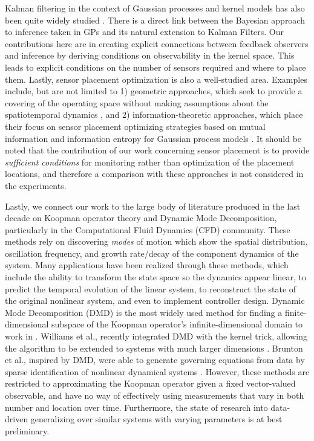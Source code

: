 Kalman filtering in the context of Gaussian processes and kernel models has also been quite widely studied \cite{carron2016machine,hartikainen2010kalman,sarkka2013spatiotemporal,stroud2001dynamic,miller1986toward}.  There is a direct link between the Bayesian approach to inference taken in GPs and its natural extension to Kalman Filters. Our contributions here are in creating explicit connections between feedback observers and inference by deriving conditions on observability in the kernel space. This leads to explicit conditions on the number of sensors required and where to place them. Lastly, sensor placement optimization is also a well-studied area. Examples include, but are not limited to 1) geometric approaches, which seek to provide a covering of the operating space without making assumptions about the spatiotemporal dynamics \cite{egerstedt:bk:2010}, and 2) information-theoretic approaches, which place their focus on sensor placement optimizing strategies based on mutual information and information entropy for Gaussian process models \cite{Guestrin05_ICML}. It should be noted that the contribution of our work concerning sensor placement is to provide \emph{sufficient conditions} for monitoring rather than optimization of the placement locations, and therefore a comparison with these approaches is not considered in the experiments. 

Lastly, we connect our work to the large body of literature produced in the last decade on Koopman operator theory and Dynamic Mode Decomposition, particularly in the Computational Fluid Dynamics (CFD) community. These methods rely on discovering \emph{modes} of motion which show the spatial distribution, oscillation frequency, and growth rate/decay of the component dynamics of the system. Many applications have been realized through these methods, which include the ability to transform the state space so the dynamics appear linear, to predict the temporal evolution of the linear system, to reconstruct the state of the original nonlinear system, and even to implement controller design. Dynamic Mode Decomposition (DMD) is the most widely used method for finding a finite-dimensional subspace of the Koopman operator's infinite-dimensional domain to work in \cite{schmid2010dynamic}. Williams et al., recently integrated DMD with the kernel trick, allowing the algorithm to be extended to systems with much larger dimensions \cite{williams2015kerneldmd}. Brunton et al., inspired by DMD, were able to generate governing equations from data by sparse identification of nonlinear dynamical systems \cite{brunton2016discovering}. However, these methods are restricted to approximating the Koopman operator given a fixed vector-valued observable, and have no way of effectively using measurements that vary in both number and location over time. Furthermore, the state of research into data-driven generalizing over similar systems with varying parameters is at best preliminary.
